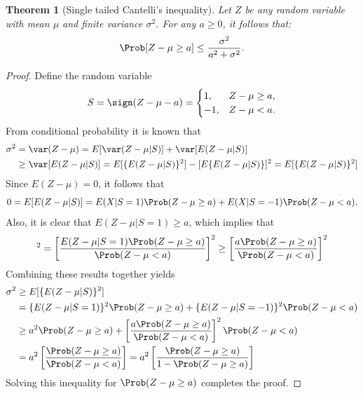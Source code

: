 \documentclass[12pt]{amsart}
\newtheorem{theorem}{Theorem}
\begin{document}
\begin{theorem}[Single tailed Cantelli's inequality]\label{Can}
Let $Z$ be any random variable with mean $\mu$ and finite variance $\sigma^2$.  For any $a\geq 0$, it
follows that:
\[
\Prob[Z-\mu \geq a]\leq \frac{\sigma^2}{a^2+\sigma^2}.
\]
\end{theorem}
\begin{proof}Define the random variable
\[ S=\sign(Z - \mu - a) = \begin{cases} 1, & Z - \mu \geq a,\\ -1, & Z - \mu <a. \end{cases}
\]
From conditional probability it is known that
\begin{align*}
\sigma^2 &= \var(Z-\mu)=E[\var(Z-\mu|S)]+\var[E(Z-\mu|S)] \\
&\geq\var[E(Z-\mu|S)]= E[\{E(Z-\mu|S)\}^2]-[E\{E(Z-\mu|S)\}]^2 =  E[\{E(Z-\mu|S)\}^2]
\end{align*}
Since $E(Z-\mu)=0$, it follows that
\begin{equation*}
0= E[E(Z-\mu|S)]=E(X|S=1)\Prob(Z - \mu \geq a)+E(X|S=-1)\Prob(Z - \mu < a).
\end{equation*}
Also, it is clear that $E(Z - \mu|S=1) \ge a$, which implies that
\begin{equation*}
[E(Z - \mu|S=-1)]^2=\left[\frac{E(Z - \mu|S=1)\Prob(Z - \mu \geq a)}{\Prob(Z - \mu < a)}\right]^2\geq \left[\frac{a\Prob(Z - \mu \geq a)}{\Prob(Z - \mu < a)}\right]^2
\end{equation*}
Combining these results together yields
\begin{align*}
\sigma^2 & \ge E[\{E(Z-\mu|S)\}^2]\\
& =\{E(Z-\mu|S=1)\}^2 \Prob(Z - \mu \geq a) + \{E(Z-\mu|S=-1)\}^2 \Prob(Z - \mu < a) \\
& \ge a^2 \Prob(Z - \mu \geq a) + \left[\frac{a\Prob(Z - \mu \geq a)}{\Prob(Z - \mu < a)}\right]^2 \Prob(Z - \mu < a) \\
&= a^2 \left[\frac{ \Prob(Z - \mu \geq a)}{\Prob(Z - \mu < a)}\right] = a^2 \left[\frac{ \Prob(Z - \mu \geq a)}{1  - \Prob(Z - \mu \ge a)}\right]
\end{align*}
Solving this inequality for $\Prob(Z - \mu \geq a)$ completes the proof.
\end{proof}
\end{document}
